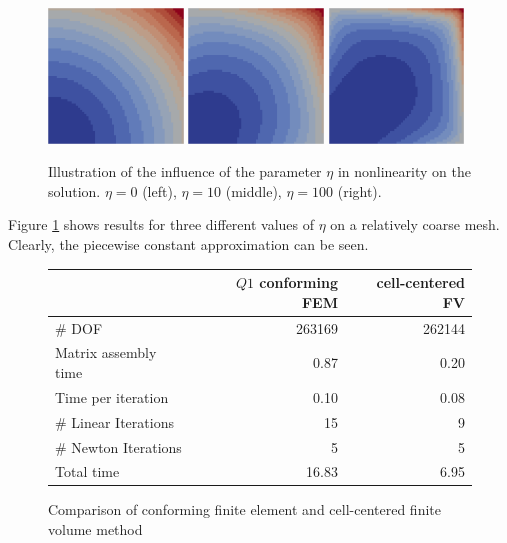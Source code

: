 \documentclass[a4paper,12pt]{article}
\begin{document}
\begin{figure}
\begin{center}
\includegraphics[width=0.32\textwidth]{eta0}\hfill
\includegraphics[width=0.32\textwidth]{eta10}\hfill
\includegraphics[width=0.32\textwidth]{eta100}
\end{center}
\caption{Illustration of the influence of the parameter $\eta$
in nonlinearity on the solution. $\eta=0$ (left), $\eta=10$ (middle), $\eta=100$ (right).}
\label{fig:Bunt}
\end{figure}

Figure \ref{fig:Bunt} shows results for three different values of $\eta$ on a relatively
coarse mesh. Clearly, the piecewise constant approximation can be seen.

\begin{figure}
\caption{Comparison of conforming finite element and cell-centered finite volume
method}
\label{fig:Compare}
\begin{center}
\begin{tabular}{l|r|r}
 & \multicolumn{1}{r|}{$Q1$ conforming FEM} & \multicolumn{1}{r}{cell-centered FV} \\
 \hline
 \# DOF & 263169 & 262144 \\
 Matrix assembly time & 0.87 & 0.20 \\
 Time per iteration & 0.10 & 0.08 \\
 \# Linear Iterations & 15 & 9 \\
 \# Newton Iterations & 5 & 5 \\
 Total time & 16.83 & 6.95 
\end{tabular}
\end{center}
\end{figure}
\end{document}
